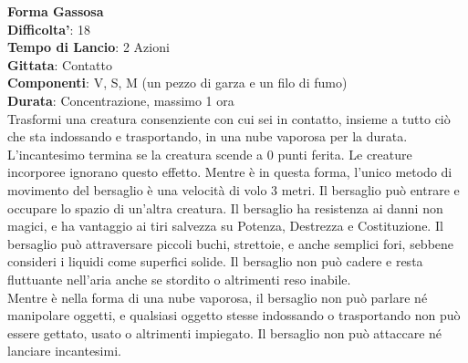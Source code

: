 \begin{multicols}{2}
\medskip\textbf{Forma Gassosa}\\
\textbf{Difficolta'}: 18\\
\textbf{Tempo di Lancio}: 2 Azioni\\
\textbf{Gittata}: Contatto\\
\textbf{Componenti}: V, S, M (un pezzo di garza e un filo di fumo)\\
\textbf{Durata}: Concentrazione, massimo 1 ora\\
Trasformi una creatura consenziente con cui sei in contatto, insieme a tutto ciò che sta indossando e trasportando, in una nube vaporosa per la durata. L’incantesimo termina se la creatura scende a 0 punti ferita. Le creature incorporee ignorano questo effetto. Mentre è in questa forma, l’unico metodo di movimento del bersaglio è una velocità di volo 3 metri. Il bersaglio può entrare e occupare lo spazio di un’altra creatura. Il bersaglio ha resistenza ai danni non magici, e ha vantaggio ai tiri salvezza su Potenza, Destrezza e Costituzione. Il bersaglio può attraversare piccoli buchi, strettoie, e anche semplici fori, sebbene consideri i liquidi come superfici solide. Il bersaglio non può cadere e resta fluttuante nell’aria anche se stordito o altrimenti reso inabile.\\
Mentre è nella forma di una nube vaporosa, il bersaglio non può parlare né manipolare oggetti, e qualsiasi oggetto stesse indossando o trasportando non può essere gettato, usato o altrimenti impiegato. Il bersaglio non può attaccare né lanciare incantesimi. 



\end{multicols}
